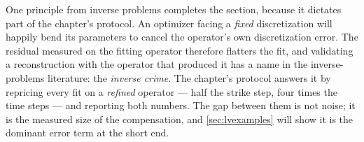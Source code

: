 One principle from inverse problems completes the section, because it
dictates part of the chapter's protocol.  An optimizer facing a
\emph{fixed} discretization will happily bend its parameters to cancel
the operator's own discretization error.  The residual measured on the
fitting operator therefore flatters the fit, and validating a
reconstruction with the operator that produced it has a name in the
inverse-problems literature: the \emph{inverse crime}.  The chapter's
protocol answers it by repricing every fit on a \emph{refined}
operator --- half the strike step, four times the time steps --- and
reporting both numbers.  The gap between them is not noise; it is the
measured size of the compensation, and \cref{sec:lvexamples} will show
it is the dominant error term at the short end.

